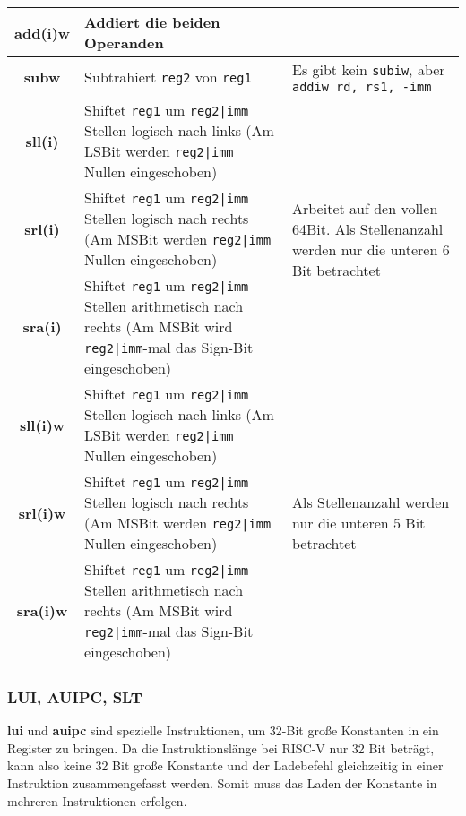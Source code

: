 \begin{tabular}{|c|p{8cm}|p{4cm}|}
	\hline
	\textbf{add(i)w} & Addiert die beiden Operanden & \\
	\hline
	\textbf{subw} & Subtrahiert \texttt{reg2} von \texttt{reg1}& Es gibt kein \texttt{subiw}, aber \texttt{addiw rd, rs1, -imm} \\
	\hline
	\textbf{sll(i)} & Shiftet \texttt{reg1} um \texttt{reg2|imm} Stellen logisch nach links (Am LSBit werden \texttt{reg2|imm} Nullen eingeschoben) & \multirow{3}{4cm}{Arbeitet auf den vollen 64Bit. Als Stellenanzahl werden nur die unteren 6 Bit betrachtet} \\
	\cline{1-2}
	\textbf{srl(i)} & Shiftet \texttt{reg1} um \texttt{reg2|imm} Stellen logisch nach rechts (Am MSBit werden \texttt{reg2|imm} Nullen eingeschoben) & \\
	\cline{1-2}
	\textbf{sra(i)} & Shiftet \texttt{reg1} um \texttt{reg2|imm} Stellen arithmetisch nach rechts (Am MSBit wird \texttt{reg2|imm}-mal das Sign-Bit eingeschoben) & \\
	\hline
	\textbf{sll(i)w} & Shiftet \texttt{reg1} um \texttt{reg2|imm} Stellen logisch nach links (Am LSBit werden \texttt{reg2|imm} Nullen eingeschoben) & \multirow{3}{4cm}{Als Stellenanzahl werden nur die unteren 5 Bit betrachtet} \\
	\cline{1-2}
	\textbf{srl(i)w} & Shiftet \texttt{reg1} um \texttt{reg2|imm} Stellen logisch nach rechts (Am MSBit werden \texttt{reg2|imm} Nullen eingeschoben) & \\
	\cline{1-2}
	\textbf{sra(i)w} & Shiftet \texttt{reg1} um \texttt{reg2|imm} Stellen arithmetisch nach rechts (Am MSBit wird \texttt{reg2|imm}-mal das Sign-Bit eingeschoben) & \\
	\hline
\end{tabular}

\subsubsection{LUI, AUIPC, SLT}

\textbf{lui} und \textbf{auipc} sind spezielle Instruktionen, um 32-Bit große
Konstanten in ein Register zu bringen. Da die Instruktionslänge bei RISC-V nur
32 Bit beträgt, kann also keine 32 Bit große Konstante und der Ladebefehl
gleichzeitig in einer Instruktion zusammengefasst werden. Somit muss das Laden
der Konstante in mehreren Instruktionen erfolgen.\\

